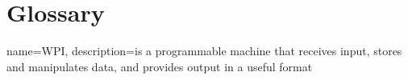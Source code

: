 \chapter*{Glossary}

{
  name=WPI,
  description={is a programmable machine that receives input,
               stores and manipulates data, and provides
               output in a useful format}
}
\glsaddall
\printglossaries
